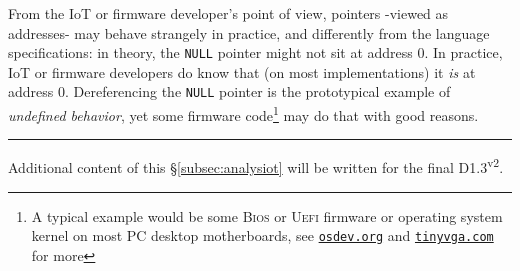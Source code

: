  From the IoT or firmware developer's point of view, pointers -viewed
 as addresses- may behave strangely in practice, and differently from
 the language specifications: in theory, the \texttt{NULL} pointer
 might not sit at address 0. In practice, IoT or firmware developers
 do know that (on most implementations) it \emph{is} at address
 0. Dereferencing the \texttt{NULL} pointer is the prototypical
 example of \emph{undefined behavior}, yet some firmware
 code\footnote{A typical example would be some \textsc{Bios} or
   \textsc{Uefi} firmware or operating system kernel on most PC
   desktop motherboards, see
   \href{https://osdev.org/}{\texttt{osdev.org}} and
   \href{http://tinyvga.com/}{\texttt{tinyvga.com}} for more} may do
 that with good reasons.
 
\bigskip

\hrule


Additional content of this \S\ref{subsec:analysiot} will be written for the final D1.3\textsuperscript{v2}.


